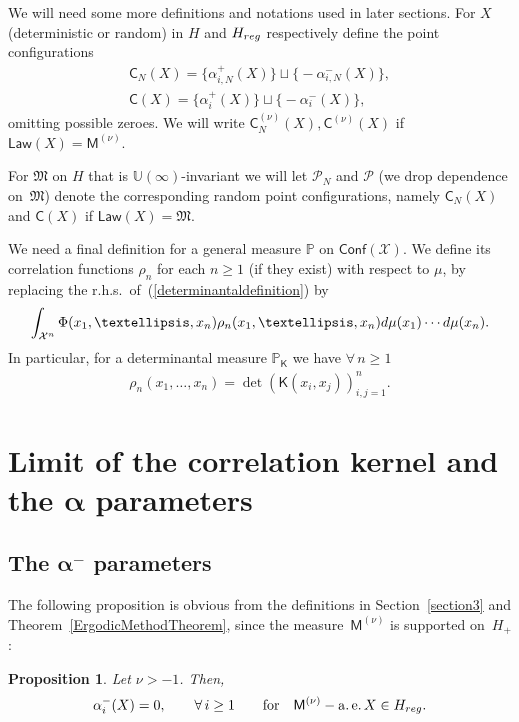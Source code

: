 \documentclass[11pt]{article}
\numberwithin{equation}{section}
\newtheorem{Proposition}[Theorem]{Proposition}
{ \theoremstyle{definition}
\newtheorem{Definition}[Theorem]{Definition}
\newtheorem{Remark}[Theorem]{Remark} }
\begin{document}
We will need some more definitions and notations used in later sections. For $X$ (deterministic or random) in $H$ and $H_{{\rm reg}}$ respectively define the point configurations
\begin{gather*}
\mathsf{C}_N(X) =\big\{\alpha_{i,N}^{+}(X)\big\} \sqcup \big\{{-}\alpha_{i,N}^{-}(X)\big\}, \\
\mathsf{C}(X) =\big\{\alpha_{i}^{+}(X)\big\} \sqcup \big\{{-}\alpha_{i}^{-}(X)\big\},
\end{gather*}
omitting possible zeroes. We will write $\mathsf{C}^{(\nu)}_N(X), \mathsf{C}^{(\nu)}(X)$ if $\mathsf{Law}(X)=\mathsf{M}^{(\nu)}$.

For $\mathfrak{M}$ on $H$ that is $\mathbb{U}(\infty)$-invariant we will let $\mathcal{P}_N$ and $\mathcal{P}$ (we drop dependence on~$\mathfrak{M}$) denote the corresponding random point configurations, namely $\mathsf{C}_N(X)$ and $\mathsf{C}(X)$ if $\mathsf{Law}(X)=\mathfrak{M}$.


We need a final definition for a general measure $\mathbb{P}$ on $\mathsf{Conf}(\mathcal{X})$. We define its correlation functions $\rho_n$ for each $n\ge 1$ (if they exist) with respect to $\mu$, by replacing the r.h.s.\ of~(\ref{determinantaldefinition}) by
\begin{gather*}
\int_{\mathcal{X}^n}^{}\Phi(x_1,\dots,x_n) \rho_n(x_1,\dots,x_n){\rm d}\mu(x_1) \cdots {\rm d}\mu(x_n).
\end{gather*}
In particular, for a determinantal measure $\mathbb{P}_{\mathsf{K}}$ we have $\forall\, n \ge 1$
\begin{gather*}
\rho_n(x_1,\dots,x_n)=\det (\mathsf{K}(x_i,x_j) )_{i,j=1}^n.
\end{gather*}

\section[Limit of the correlation kernel and the $\alpha$ parameters]{Limit of the correlation kernel and the $\boldsymbol{\alpha}$ parameters}\label{section4}
\subsection[The $\alpha^-$ parameters]{The $\boldsymbol{\alpha^-}$ parameters}\label{section4.1}
The following proposition is obvious from the definitions in Section~\ref{section3} and Theorem~\ref{ErgodicMethodTheorem}, since the measure~$\mathsf{M}^{(\nu)}$ is supported on~$H_+$:
\begin{Proposition}\label{PropositionAlphaMinus}
Let $\nu>-1$. Then,
\begin{gather*}
\alpha_i^-(X)=0,\qquad \forall\, i\ge 1 \qquad \text{for} \quad \mathsf{M}^{(\nu)}-\operatorname{a.e.} X \in H_{{\rm reg}}.
\end{gather*}
\end{Proposition}
\end{document}
